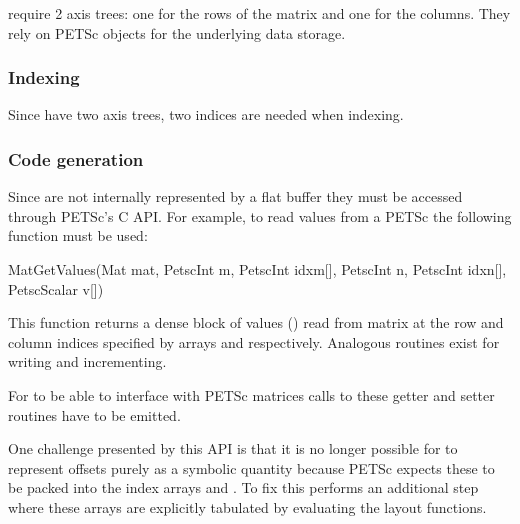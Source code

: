 \documentclass[thesis]{subfiles}
\begin{document}

 require 2 axis trees: one for the rows of the matrix and one for the columns.
They rely on PETSc  objects for the underlying data storage.

\subsubsection{Indexing}

Since  have two axis trees, two indices are needed when indexing.


\subsubsection{Code generation}

Since  are not internally represented by a flat buffer they must be accessed through PETSc's C API.
For example, to read values from a PETSc  the following function must be used:

\begin{cinline}
  MatGetValues(Mat mat,
               PetscInt m, PetscInt idxm[],
               PetscInt n, PetscInt idxn[],
               PetscScalar v[])
\end{cinline}

This function returns a dense block of values () read from matrix  at the row and column indices specified by arrays  and  respectively.
Analogous routines exist for writing and incrementing.

For  to be able to interface with PETSc matrices calls to these getter and setter routines have to be emitted.

One challenge presented by this API is that it is no longer possible for  to represent offsets purely as a symbolic quantity because PETSc expects these to be packed into the index arrays  and .
To fix this  performs an additional step where these arrays are explicitly tabulated by evaluating the layout functions. %

\end{document}
